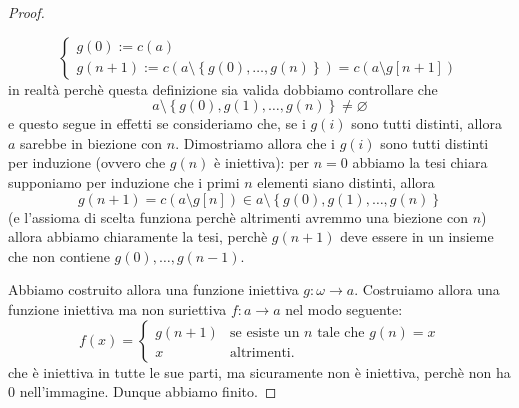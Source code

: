 \documentclass[11pt]{scrartcl}
\newcommand{\eset}{\varnothing}
\begin{document}
\begin{proof}
\begin{subproof}[Dimostrazione]
 			$$
 			\begin{cases}
 				g(0):= c(a) \\
 				g(n+1):=c\left(a\setminus \left\{g(0),\dots,g(n)\right\}\right)=c\left(a\setminus g[n+1]\right)
 			\end{cases}
 			$$
 			in realtà perchè questa definizione sia valida dobbiamo controllare che $$a\setminus \left\{g(0),g(1),\dots,g(n)\right\}\ne \eset$$
 			e questo segue in effetti se consideriamo che, se i $g(i)$ sono tutti distinti, allora $a$ sarebbe in biezione con $n$. Dimostriamo allora che i $g(i)$ sono tutti distinti per induzione (ovvero che $g(n)$ è iniettiva):
 			per $n=0$ abbiamo la tesi chiara supponiamo per induzione che i primi $n$ elementi siano distinti, allora 
 			$$g(n+1)=c(a\setminus g[n])\in a\setminus \left\{g(0),g(1),\dots,g(n)\right\}$$
 			(e l'assioma di scelta funziona perchè altrimenti avremmo una biezione con $n$) allora abbiamo chiaramente la tesi, perchè $g(n+1)$ deve essere in un insieme che non contiene $g(0),\dots,g(n-1)$.
 		\end{subproof}
 		Abbiamo costruito allora una funzione iniettiva $g:\omega\to a$. Costruiamo allora una funzione iniettiva ma non suriettiva $f:a\to a$ nel modo seguente:
 		$$
 		f(x)=
 		\begin{cases}
 			g(n+1) & \text{se esiste un $n$ tale che $g(n)=x$} \\
 			x & \text{altrimenti.}
 		\end{cases}
 		$$
 		che è iniettiva in tutte le sue parti, ma sicuramente non è iniettiva, perchè non ha $0$ nell'immagine. Dunque abbiamo finito.
 	\end{proof}
 	
\end{document}
